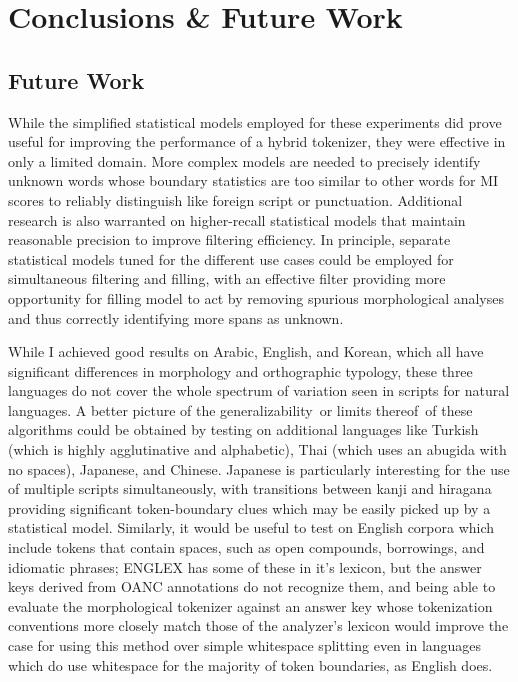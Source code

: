 \chapter{Conclusions \& Future Work}



\section{Future Work}
While the simplified statistical models employed for these experiments did prove useful for improving the performance of a hybrid tokenizer, they were effective in only a limited domain. More complex models are needed to precisely identify unknown words whose boundary statistics are too similar to other words for MI scores to reliably distinguish like foreign script or punctuation. Additional research is also warranted on higher-recall statistical models that maintain reasonable precision to improve filtering efficiency. In principle, separate statistical models tuned for the different use cases could be employed for simultaneous filtering and filling, with an effective filter providing more opportunity for filling model to act by removing spurious morphological analyses and thus correctly identifying more spans as unknown.

While I achieved good results on Arabic, English, and Korean, which all have significant differences in morphology and orthographic typology, these three languages do not cover the whole spectrum of variation seen in scripts for natural languages. A better picture of the generalizability\textemdash~or limits thereof\textemdash~of these algorithms could be obtained by testing on additional languages like Turkish (which is highly agglutinative and alphabetic), Thai (which uses an abugida with no spaces), Japanese, and Chinese.
Japanese is particularly interesting for the use of multiple scripts simultaneously, with transitions between kanji and hiragana providing significant token-boundary clues which may be easily picked up by a statistical model. Similarly, it would be useful to test on English corpora which include tokens that contain spaces, such as open compounds, borrowings, and idiomatic phrases; ENGLEX has some of these in it's lexicon, but the answer keys derived from OANC annotations do not recognize them, and being able to evaluate the morphological tokenizer against an answer key whose tokenization conventions more closely match those of the analyzer's lexicon would improve the case for using this method over simple whitespace splitting even in languages which do use whitespace for the majority of token boundaries, as English does.

